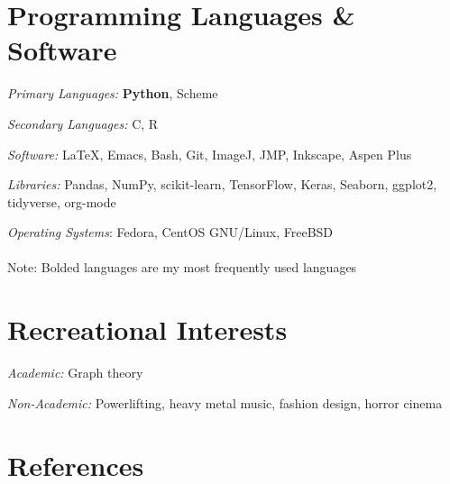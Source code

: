 \documentclass[letterpaper]{article}
\renewenvironment{itemize}{
  \begin{list}{}{
    \setlength{\leftmargin}{1.5em}
  }
}{
  \end{list}
}
\begin{document}

\section*{\textbf{Programming Languages \& Software}}
\begin{itemize}
    \item \textit{Primary Languages:} \textbf{Python}, Scheme
    \item \textit{Secondary Languages:} C, R
    \item \textit{Software:} \LaTeX, Emacs, Bash, Git, ImageJ, JMP, Inkscape, Aspen Plus
    \item \textit{Libraries:} Pandas, NumPy, scikit-learn, TensorFlow, Keras, Seaborn, ggplot2, tidyverse, org-mode
    \item \textit{Operating Systems}: Fedora, CentOS GNU/Linux, FreeBSD\\\\
    \tiny{Note: Bolded languages are my most frequently used languages}
\end{itemize}

\section*{\textbf{Recreational Interests}}
\begin{itemize}
\item \textit{Academic:} Graph theory
\item \textit{Non-Academic:} Powerlifting, heavy metal music, fashion design, horror cinema
\end{itemize}

\section*{\textbf{References}}
\end{document}
